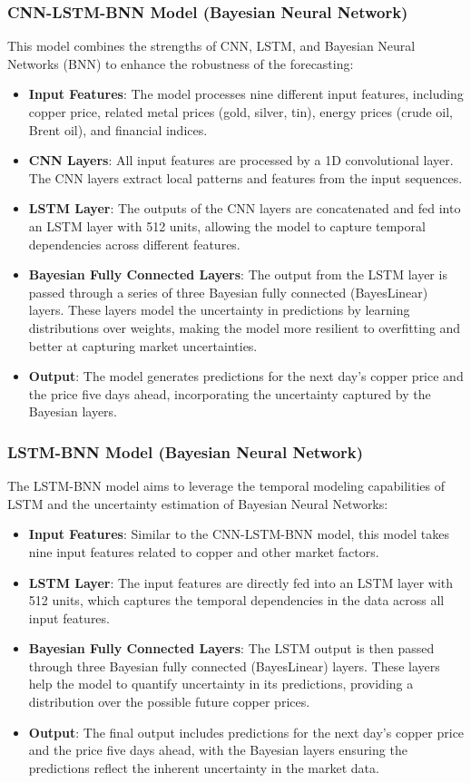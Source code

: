 \documentclass[final-report]{report-template}
\begin{document}
\subsubsection{\textbf{CNN-LSTM-BNN Model (Bayesian Neural Network)}}
This model combines the strengths of CNN, LSTM, and Bayesian Neural Networks (BNN) to enhance the robustness of the forecasting:
\begin{itemize}
\item \textbf{Input Features}: The model processes nine different input features, including copper price, related metal prices (gold, silver, tin), energy prices (crude oil, Brent oil), and financial indices.
\item \textbf{CNN Layers}: All input features are  processed by a 1D convolutional layer. The CNN layers extract local patterns and features from the input sequences.
\item \textbf{LSTM Layer}: The outputs of the CNN layers are concatenated and fed into an LSTM layer with 512 units, allowing the model to capture temporal dependencies across different features.
\item \textbf{Bayesian Fully Connected Layers}: The output from the LSTM layer is passed through a series of three Bayesian fully connected (BayesLinear) layers. These layers model the uncertainty in predictions by learning distributions over weights, making the model more resilient to overfitting and better at capturing market uncertainties.
\item \textbf{Output}: The model generates predictions for the next day's copper price and the price five days ahead, incorporating the uncertainty captured by the Bayesian layers.
\end{itemize}

\subsubsection{\textbf{LSTM-BNN Model (Bayesian Neural Network})}
The LSTM-BNN model aims to leverage the temporal modeling capabilities of LSTM and the uncertainty estimation of Bayesian Neural Networks:
\begin{itemize}
\item \textbf{Input Features}: Similar to the CNN-LSTM-BNN model, this model takes nine input features related to copper and other market factors.
\item \textbf{LSTM Layer}: The input features are directly fed into an LSTM layer with 512 units, which captures the temporal dependencies in the data across all input features.
\item \textbf{Bayesian Fully Connected Layers}: The LSTM output is then passed through three Bayesian fully connected (BayesLinear) layers. These layers help the model to quantify uncertainty in its predictions, providing a distribution over the possible future copper prices.
\item \textbf{Output}: The final output includes predictions for the next day's copper price and the price five days ahead, with the Bayesian layers ensuring the predictions reflect the inherent uncertainty in the market data.
\end{itemize}
\end{document}
